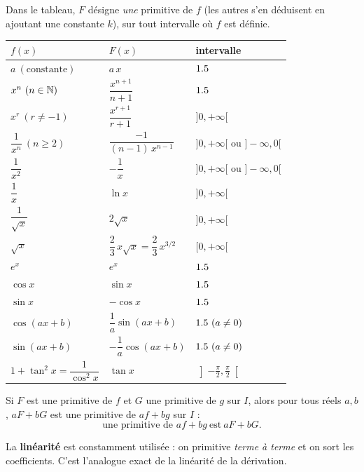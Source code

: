\begin{propriete}
Dans le tableau, $F$ désigne \emph{une} primitive de $f$ (les autres s'en déduisent en
ajoutant une constante $k$), sur tout intervalle où $f$ est définie.
\begin{center}\small
\renewcommand{\arraystretch}{1.6}
\begin{tabular}{@{}lll@{}}
\toprule
$f(x)$ & $F(x)$ & intervalle\\
\midrule
$a\ (\text{constante})$ & $a\,x$ & $1.5$\\
$x^{n}\ (n\in\N)$ & $\dfrac{x^{n+1}}{n+1}$ & $1.5$\\
$x^{r}\ (r\neq-1)$ & $\dfrac{x^{r+1}}{r+1}$ & $]0,+\infty[$\\
$\dfrac{1}{x^{n}}\ (n\ge2)$ & $\dfrac{-1}{(n-1)\,x^{n-1}}$ & $]0,+\infty[$ ou $]-\infty,0[$\\
$\dfrac1{x^{2}}$ & $-\dfrac1x$ & $]0,+\infty[$ ou $]-\infty,0[$\\
$\dfrac1x$ & $\ln x$ & $]0,+\infty[$\\
$\dfrac1{\sqrt x}$ & $2\sqrt x$ & $]0,+\infty[$\\
$\sqrt x$ & $\dfrac23\,x\sqrt x=\dfrac23\,x^{3/2}$ & $[0,+\infty[$\\
$e^{x}$ & $e^{x}$ & $1.5$\\
$\cos x$ & $\sin x$ & $1.5$\\
$\sin x$ & $-\cos x$ & $1.5$\\
$\cos(ax+b)$ & $\dfrac1a\sin(ax+b)$ & $\R\ (a\neq0)$\\
$\sin(ax+b)$ & $-\dfrac1a\cos(ax+b)$ & $\R\ (a\neq0)$\\
$1+\tan^{2}x=\dfrac1{\cos^{2}x}$ & $\tan x$ & $\left]-\frac\pi2,\frac\pi2\right[$\\
\bottomrule
\end{tabular}
\end{center}
\end{propriete}

\begin{propriete}[Linéarité]
Si $F$ est une primitive de $f$ et $G$ une primitive de $g$ sur $I$, alors pour tous réels
$a,b$, $aF+bG$ est une primitive de $af+bg$ sur $I$ :
\[
\text{une primitive de }af+bg\ \text{est}\ aF+bG.
\]
\end{propriete}

\begin{remarque}
La \textbf{linéarité} est constamment utilisée : on primitive \emph{terme à terme} et on
sort les coefficients. C'est l'analogue exact de la linéarité de la dérivation.
\end{remarque}

